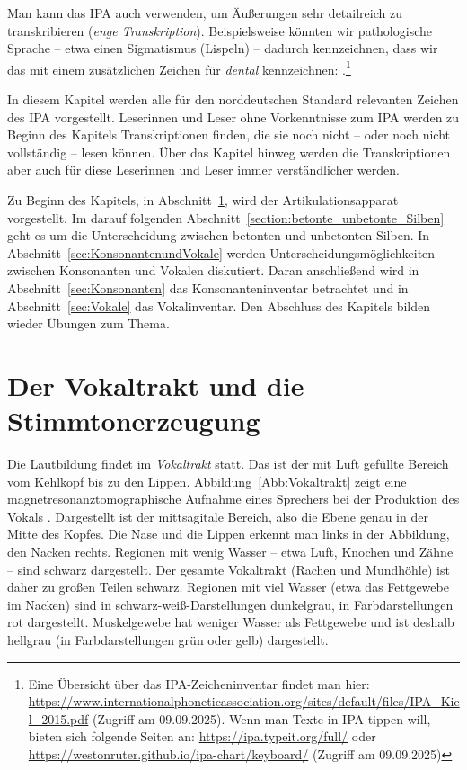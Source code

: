 Man kann das IPA auch verwenden, um Äußerungen sehr detailreich zu transkribieren (\textit{enge Transkription}). Beispielsweise könnten wir pathologische Sprache -- etwa einen Sigmatismus (Lispeln) -- dadurch kennzeichnen, dass wir das \textipa{[s]} mit einem zusätzlichen Zeichen für \textit{dental} kennzeichnen: \textipa{[\textsubbridge{s}]}.\footnote{Eine Übersicht über das IPA-Zeicheninventar findet man hier:  \url{https://www.internationalphoneticassociation.org/sites/default/files/IPA_Kiel_2015.pdf} (Zugriff am 09.09.2025). Wenn man Texte in IPA tippen will, bieten sich folgende Seiten an: \url{https://ipa.typeit.org/full/} oder \url{https://westonruter.github.io/ipa-chart/keyboard/} (Zugriff am 09.09.2025)}

In diesem Kapitel werden alle für den norddeutschen Standard relevanten Zeichen des IPA vorgestellt. Leserinnen und Leser ohne Vorkenntnisse zum IPA werden zu Beginn des Kapitels Transkriptionen finden, die sie noch nicht -- oder noch nicht vollständig -- lesen können. Über das Kapitel hinweg werden die Transkriptionen aber auch für diese Leserinnen und Leser immer verständlicher werden.

Zu Beginn des Kapitels, in Abschnitt~\ref{sec:Vokaltrakt}, wird der Artikulationsapparat vorgestellt. Im darauf folgenden Abschnitt~\ref{section:betonte_unbetonte_Silben} geht es um die Unterscheidung zwischen betonten und unbetonten Silben. In Abschnitt~\ref{sec:KonsonantenundVokale} werden Unterscheidungsmöglichkeiten zwischen Konsonanten und Vokalen diskutiert. Daran anschließend wird in Abschnitt~\ref{sec:Konsonanten} das Konsonanteninventar betrachtet und in Abschnitt~\ref{sec:Vokale} das Vokalinventar. Den Abschluss des Kapitels bilden wieder Übungen zum Thema.


\section{Der Vokaltrakt und die Stimmtonerzeugung}\label{sec:Vokaltrakt}

Die Lautbildung findet im \textit{Vokaltrakt} statt. Das ist der mit Luft gefüllte Bereich vom Kehlkopf bis zu den Lippen. Abbildung~\ref{Abb:Vokaltrakt} zeigt eine magnetresonanztomographische Aufnahme eines Sprechers bei der Produktion des Vokals \textipa{[a]}. Dargestellt ist der mittsagitale Bereich, also die Ebene genau in der Mitte des Kopfes. Die Nase und die Lippen erkennt man links in der Abbildung, den Nacken rechts. Regionen mit wenig Wasser -- etwa Luft, Knochen und Zähne -- sind schwarz dargestellt. Der gesamte Vokaltrakt (Rachen und Mundhöhle) ist daher zu großen Teilen schwarz. Regionen mit viel Wasser (etwa das Fettgewebe im Nacken) sind in schwarz-weiß-Darstellungen dunkelgrau, in Farbdarstellungen rot dargestellt. Muskelgewebe hat weniger Wasser als Fettgewebe und ist deshalb hellgrau (in Farbdarstellungen grün oder gelb) dargestellt.


